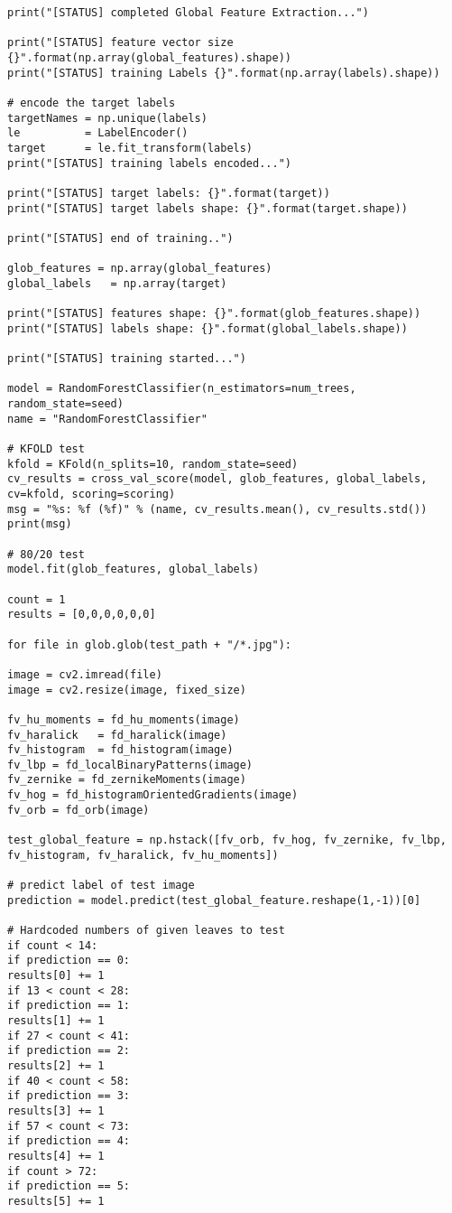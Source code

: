 \documentclass{article}
\begin{document}
\begin{verbatim}
print("[STATUS] completed Global Feature Extraction...")

print("[STATUS] feature vector size {}".format(np.array(global_features).shape))
print("[STATUS] training Labels {}".format(np.array(labels).shape))

# encode the target labels
targetNames = np.unique(labels)
le          = LabelEncoder()
target      = le.fit_transform(labels)
print("[STATUS] training labels encoded...")

print("[STATUS] target labels: {}".format(target))
print("[STATUS] target labels shape: {}".format(target.shape))

print("[STATUS] end of training..")

glob_features = np.array(global_features)
global_labels   = np.array(target)

print("[STATUS] features shape: {}".format(glob_features.shape))
print("[STATUS] labels shape: {}".format(global_labels.shape))

print("[STATUS] training started...")

model = RandomForestClassifier(n_estimators=num_trees, random_state=seed)
name = "RandomForestClassifier"

# KFOLD test
kfold = KFold(n_splits=10, random_state=seed)
cv_results = cross_val_score(model, glob_features, global_labels, cv=kfold, scoring=scoring)
msg = "%s: %f (%f)" % (name, cv_results.mean(), cv_results.std())
print(msg)

# 80/20 test
model.fit(glob_features, global_labels)

count = 1
results = [0,0,0,0,0,0]

for file in glob.glob(test_path + "/*.jpg"):

image = cv2.imread(file)   
image = cv2.resize(image, fixed_size)

fv_hu_moments = fd_hu_moments(image)
fv_haralick   = fd_haralick(image)
fv_histogram  = fd_histogram(image)
fv_lbp = fd_localBinaryPatterns(image)
fv_zernike = fd_zernikeMoments(image)
fv_hog = fd_histogramOrientedGradients(image) 
fv_orb = fd_orb(image)

test_global_feature = np.hstack([fv_orb, fv_hog, fv_zernike, fv_lbp, fv_histogram, fv_haralick, fv_hu_moments])

# predict label of test image
prediction = model.predict(test_global_feature.reshape(1,-1))[0]

# Hardcoded numbers of given leaves to test
if count < 14:
if prediction == 0:
results[0] += 1
if 13 < count < 28:
if prediction == 1:
results[1] += 1
if 27 < count < 41:
if prediction == 2:
results[2] += 1
if 40 < count < 58:
if prediction == 3:
results[3] += 1
if 57 < count < 73:
if prediction == 4:
results[4] += 1
if count > 72:
if prediction == 5:
results[5] += 1


\end{verbatim}
\end{document}
